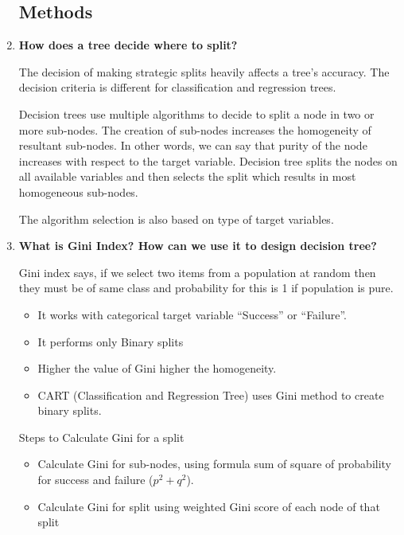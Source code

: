 \begin{enumerate}
\subsection{Methods}





\item{\textbf{\color{blue} How does a tree decide where to split?}}

The decision of making strategic splits heavily affects a tree’s accuracy. The decision criteria is different for classification and regression trees.

Decision trees use multiple algorithms to decide to split a node in two or more sub-nodes. The creation of sub-nodes increases the homogeneity of resultant sub-nodes. In other words, we can say that purity of the node increases with respect to the target variable. Decision tree splits the nodes on all available variables and then selects the split which results in most homogeneous sub-nodes.

The algorithm selection is also based on type of target variables. 


\item{\textbf{\color{blue} What is Gini Index? How can we use it to design decision tree?}}

Gini index says, if we select two items from a population at random then they must be of same class and probability for this is 1 if population is pure.

\begin{itemize}
\item It works with categorical target variable “Success” or “Failure”.
\item It performs only Binary splits
\item Higher the value of Gini higher the homogeneity.
\item CART (Classification and Regression Tree) uses Gini method to create binary splits.
\end{itemize}

Steps to Calculate Gini for a split

\begin{itemize}
\item Calculate Gini for sub-nodes, using formula sum of square of probability for success and failure ($p^2+q^2$).
\item Calculate Gini for split using weighted Gini score of each node of that split 
\end{itemize}


\end{enumerate}

